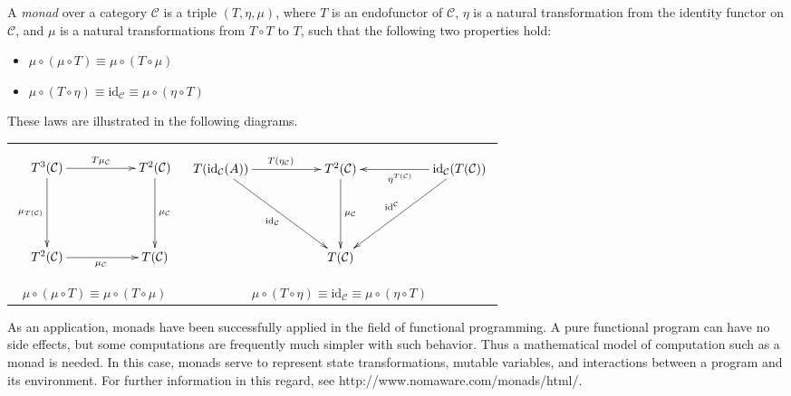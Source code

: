 \documentclass[12pt]{article}
\begin{document}
A \emph{monad} over a category $\mathcal{C}$ is a triple $(T,\eta,\mu)$, where
$T$ is an endofunctor of $\mathcal{C}$, $\eta$ is a natural transformation from the identity functor on $\mathcal{C}$, and $\mu$ is a natural transformations from $T\circ T$ to $T$, such that the following two properties hold:

\begin{itemize}
\item $\mu\circ(\mu\circ T)\equiv\mu\circ(T\circ\mu)$
\item $\mu\circ(T\circ\eta)\equiv\mathrm{id}_\mathcal{C}\equiv\mu\circ(\eta\circ T)$
\end{itemize}

These laws are illustrated in the following diagrams.

\begin{tabular}{cc}
\begin{minipage}{.48\textwidth}
$$
\xymatrix{
T^3(\mathcal{C}) \ar[rr]^{T\mu_{\mathcal{C}}} \ar[dd]_{\mu_{T(\mathcal{C})}} &&
T^2(\mathcal{C}) \ar[dd]^{\mu_{\mathcal{C}}} \\
\\
T^2(\mathcal{C}) \ar[rr]_{\mu_{\mathcal{C}}} && T(\mathcal{C})
}
$$
\end{minipage}
&
\begin{minipage}{.48\textwidth}
$$
\xymatrix{
T(\mathrm{id}_{\mathcal{C}}(A)) \ar[rr]^{T(\eta_{\mathcal{C}})}
\ar[ddrr]_{\mathrm{id}_{\mathcal{C}}} &&
T^2(\mathcal{C}) \ar[dd]^{\mu_{\mathcal{C}}} &&
\mathrm{id}_{\mathcal{C}}(T(\mathcal{C}))
\ar[ll]^{\eta^{T(\mathcal{C})}}
\ar[ddll]_{\mathrm{id}^{\mathcal{C}}} \\
\\
&& T(\mathcal{C})
}
$$
\end{minipage} \\
$\mu\circ(\mu\circ T)\equiv\mu\circ(T\circ\mu)$ &
$\mu\circ(T\circ\eta)\equiv\mathrm{id}_\mathcal{C}\equiv\mu\circ(\eta\circ T)$
\end{tabular}

As an application, monads have been successfully applied in the field of functional programming.  A pure functional program can have no side effects, but some computations are frequently much simpler with such behavior.  Thus a mathematical model of computation such as a monad is needed.  In this case, monads serve to represent state transformations, mutable variables, and interactions between a program and its environment.  For further information in this regard, see http://www.nomaware.com/monads/html/.
\end{document}
